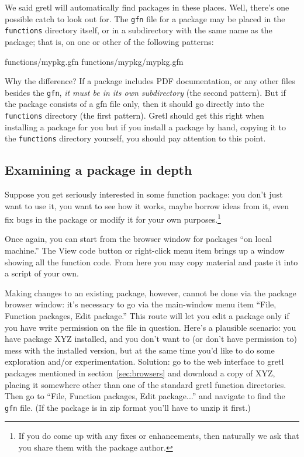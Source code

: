 \documentclass[oneside]{book}
\begin{document}
We said gretl will automatically find packages in these places. Well,
there's one possible catch to look out for. The \texttt{gfn} file for
a package may be placed in the \texttt{functions} directory itself, or
in a subdirectory with the same name as the package; that is, on one
or other of the following patterns:
%
\begin{code}
functions/mypkg.gfn
functions/mypkg/mypkg.gfn
\end{code}
%
Why the difference? If a package includes PDF documentation, or any
other files besides the \texttt{gfn}, \textit{it must be in its own
  subdirectory} (the second pattern). But if the package consists of a
gfn file only, then it should go directly into the \texttt{functions}
directory (the first pattern).  Gretl should get this right when
installing a package for you but if you install a package by hand,
copying it to the \texttt{functions} directory yourself, you should
pay attention to this point.

\subsection{Examining a package in depth}

Suppose you get seriously interested in some function package: you
don't just want to use it, you want to see how it works, maybe borrow
ideas from it, even fix bugs in the package or modify it for your own
purposes.\footnote{If you do come up with any fixes or enhancements,
  then naturally we ask that you share them with the package author.}

Once again, you can start from the browser window for packages ``on
local machine.'' The \textsf{View code} button or right-click menu
item brings up a window showing all the function code. From here
you may copy material and paste it into a script of your own.

Making changes to an existing package, however, cannot be done via the
package browser window: it's necessary to go via the main-window menu
item ``File, Function packages, Edit package.'' This route will let
you edit a package only if you have write permission on the file in
question.  Here's a plausible scenario: you have package \textsf{XYZ}
installed, and you don't want to (or don't have permission to) mess
with the installed version, but at the same time you'd like to do some
exploration and/or experimentation. Solution: go to the web interface
to gretl packages mentioned in section~\ref{sec:browsers} and download
a copy of \textsf{XYZ}, placing it somewhere other than one of the
standard gretl function directories. Then go to ``File, Function
packages, Edit package...'' and navigate to find the \texttt{gfn}
file. (If the package is in zip format you'll have to unzip it first.)
\end{document}
